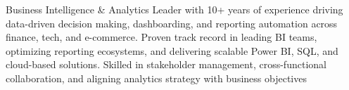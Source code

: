 


\begin{cventries}


\begin{flushleft}

Business Intelligence \&  Analytics Leader with 10+ years of experience driving data-driven decision making, 
dashboarding, and reporting automation across finance, tech, and e-commerce. Proven track record in leading BI 
teams, optimizing reporting ecosystems, and delivering scalable Power BI, SQL, and cloud-based solutions. 
Skilled in stakeholder management, cross-functional collaboration, and aligning analytics strategy with business 
objectives

\end{flushleft}


\end{cventries}

